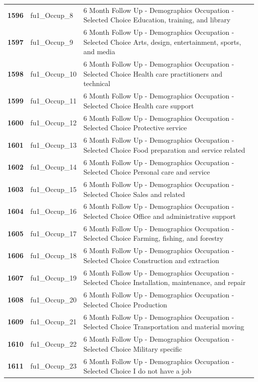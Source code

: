 \documentclass[
  letterpaper,
  DIV=11,
  numbers=noendperiod]{scrartcl}
\begin{document}
\begin{longtable}[t]{>{}cll}
\addlinespace
\textbf{1596} & fu1\_Occup\_8 & 6 Month Follow Up - Demographics Occupation - Selected Choice Education, training, and library\\
\textbf{1597} & fu1\_Occup\_9 & 6 Month Follow Up - Demographics Occupation - Selected Choice Arts, design, entertainment, sports, and media\\
\textbf{1598} & fu1\_Occup\_10 & 6 Month Follow Up - Demographics Occupation - Selected Choice Health care practitioners and technical\\
\textbf{1599} & fu1\_Occup\_11 & 6 Month Follow Up - Demographics Occupation - Selected Choice Health care support\\
\textbf{1600} & fu1\_Occup\_12 & 6 Month Follow Up - Demographics Occupation - Selected Choice Protective service\\
\addlinespace
\textbf{1601} & fu1\_Occup\_13 & 6 Month Follow Up - Demographics Occupation - Selected Choice Food preparation and service related\\
\textbf{1602} & fu1\_Occup\_14 & 6 Month Follow Up - Demographics Occupation - Selected Choice Personal care and service\\
\textbf{1603} & fu1\_Occup\_15 & 6 Month Follow Up - Demographics Occupation - Selected Choice Sales and related\\
\textbf{1604} & fu1\_Occup\_16 & 6 Month Follow Up - Demographics Occupation - Selected Choice Office and administrative support\\
\textbf{1605} & fu1\_Occup\_17 & 6 Month Follow Up - Demographics Occupation - Selected Choice Farming, fishing, and forestry\\
\addlinespace
\textbf{1606} & fu1\_Occup\_18 & 6 Month Follow Up - Demographics Occupation - Selected Choice Construction and extraction\\
\textbf{1607} & fu1\_Occup\_19 & 6 Month Follow Up - Demographics Occupation - Selected Choice Installation, maintenance, and repair\\
\textbf{1608} & fu1\_Occup\_20 & 6 Month Follow Up - Demographics Occupation - Selected Choice Production\\
\textbf{1609} & fu1\_Occup\_21 & 6 Month Follow Up - Demographics Occupation - Selected Choice Transportation and material moving\\
\textbf{1610} & fu1\_Occup\_22 & 6 Month Follow Up - Demographics Occupation - Selected Choice Military specific\\
\addlinespace
\textbf{1611} & fu1\_Occup\_23 & 6 Month Follow Up - Demographics Occupation - Selected Choice I do not have a job\\

\end{longtable}
\end{document}
